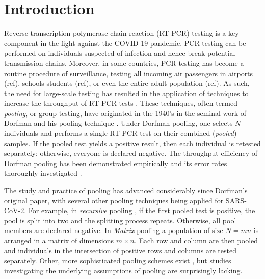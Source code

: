 \documentclass{article}
\begin{document}
\section*{Introduction}
Reverse transcription polymerase chain reaction (RT-PCR) testing is a
key component in the fight against the COVID-19 pandemic. PCR testing can be performed on individuals suspected of infection and hence break potential transmission chains. Moreover, in some countries, PCR testing has become a routine procedure of surveillance, testing all incoming air passengers in airports (ref), schools students (ref), or even the entire adult population (ref).  
As such, the need for large-scale testing has
resulted in the application of techniques to increase the throughput
of RT-PCR tests \cite{DorfmanYuvalDor, PoolSize30, BayesianDorfman,
  MatrixPooling, LionDorfman, CherifReview}. These techniques, often
termed \emph{pooling}, or group testing, have originated in the 1940's
in the seminal work of Dorfman and his pooling technique
\cite{DorfmanOriginal, DorfmanYuvalDor}. Under Dorfman pooling, one
selects $N$ individuals and performs a single RT-PCR test on their
combined (\emph{pooled}) samples. If the pooled test yields a positive
result, then each individual is retested separately; otherwise,
everyone is declared negative. The throughput efficiency of Dorfman
pooling has been demonstrated empirically \cite{DorfmanYuvalDor} and
its error rates thoroughly investigated \cite{Kim, Simplistic1,
  OptimalDorfmanPool}. 
  
The study and practice of pooling has advanced considerably since Dorfman's original paper, with 
several other pooling techniques being applied for SARS-CoV-2.
For example, in \emph{recursive} pooling \cite{Kim,RecursiveSevenFold}, if the
first pooled test is positive, the pool is split into two and the splitting
process repeats. Otherwise, all pool members are declared negative.
In \emph{Matrix} pooling \cite{MatrixPooling} a population of size
$N=mn$ is arranged in a matrix of dimensions $m\times n$. Each
row and column are then pooled and individuals in the intersection of
positive rows and columns are tested separately. Other, more sophisticated
pooling schemes exist \cite{CompressedPooling}, but studies investigating the 
underlying assumptions of pooling are surprisingly lacking.
\end{document}
